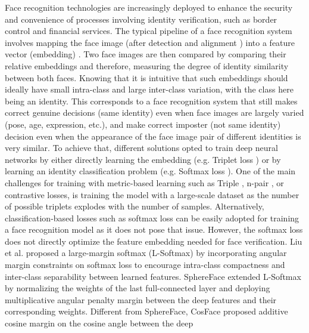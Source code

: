 \documentclass[letterpaper, 10 pt, conference]{ieeeconf}  \usepackage{times}
\begin{document}
Face recognition technologies are increasingly deployed to enhance the security and convenience of processes involving identity verification, such as border control and financial services. The typical pipeline of a face recognition system involves mapping the face image (after detection and alignment \cite{zhang2016joint}) into a feature vector (embedding) \cite{deng2019arcface,DBLP:conf/cvpr/WangWZJGZL018,DBLP:conf/fgr/CaoSXPZ18}. Two face images are then compared by comparing their relative embeddings and therefore, measuring the degree of identity similarity between both faces. Knowing that it is intuitive that such embeddings should ideally have small intra-class and large inter-class variation, with the class here being an identity. This corresponds to a face recognition system that still makes correct genuine decisions (same identity) even when face images are largely varied (pose, age, expression, etc.), and make correct imposter (not same identity) decision even when the appearance of the face image pair of different identities is very similar. To achieve that, different solutions opted to train deep neural networks by either directly learning the embedding (e.g. Triplet loss \cite{DBLP:conf/cvpr/SchroffKP15}) or by learning an identity classification problem (e.g. Softmax loss \cite{DBLP:conf/fgr/CaoSXPZ18}).
One of the main challenges for training with metric-based learning such as Triple \cite{DBLP:conf/cvpr/SchroffKP15}, n-pair \cite{DBLP:conf/nips/Sohn16}, or contrastive \cite{DBLP:conf/cvpr/ChopraHL05} losses, is training the model with a large-scale dataset as the number of possible triplets explodes with the number of samples. Alternatively, classification-based losses such as softmax loss can be easily adopted for training a face recognition model as it does not pose that issue. However, the softmax loss does not directly optimize the feature embedding needed for face verification. 
Liu et al. \cite{DBLP:conf/icml/LiuWYY16} proposed a large-margin softmax (L-Softmax) by incorporating angular margin constraints on softmax loss to encourage intra-class compactness and inter-class separability between learned features. SphereFace \cite{DBLP:conf/cvpr/LiuWYLRS17} extended L-Softmax by normalizing the weights of the last full-connected layer and deploying multiplicative angular penalty margin between the deep features and their corresponding weights. 
Different from SphereFace, CosFace \cite{DBLP:conf/cvpr/WangWZJGZL018} proposed additive cosine margin on the cosine angle between the deep
\end{document}
